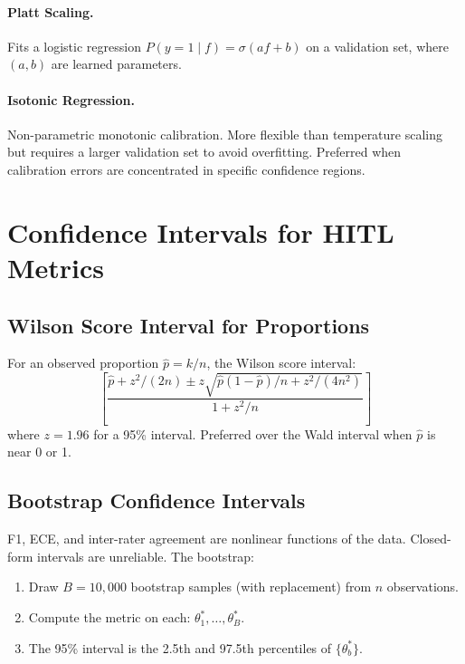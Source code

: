 \paragraph{Platt Scaling.}
Fits a logistic regression $P(y=1 \mid f) = \sigma(af + b)$ on a validation set, where $(a, b)$ are learned parameters.

\paragraph{Isotonic Regression.}
Non-parametric monotonic calibration. More flexible than temperature scaling but requires a larger validation set to avoid overfitting. Preferred when calibration errors are concentrated in specific confidence regions.

\section{Confidence Intervals for HITL Metrics}

\subsection{Wilson Score Interval for Proportions}

For an observed proportion $\hat{p} = k/n$, the Wilson score interval:
\[
\left[ \frac{\hat{p} + z^2/(2n) \pm z\sqrt{\hat{p}(1-\hat{p})/n + z^2/(4n^2)}}{1 + z^2/n} \right]
\]
where $z = 1.96$ for a 95\% interval. Preferred over the Wald interval when $\hat{p}$ is near 0 or 1.

\subsection{Bootstrap Confidence Intervals}

F1, ECE, and inter-rater agreement are nonlinear functions of the data. Closed-form intervals are unreliable. The bootstrap:
\begin{enumerate}
    \item Draw $B = 10{,}000$ bootstrap samples (with replacement) from $n$ observations.
    \item Compute the metric on each: $\theta_1^*, \ldots, \theta_B^*$.
    \item The 95\% interval is the 2.5th and 97.5th percentiles of $\{\theta_b^*\}$.
\end{enumerate}

